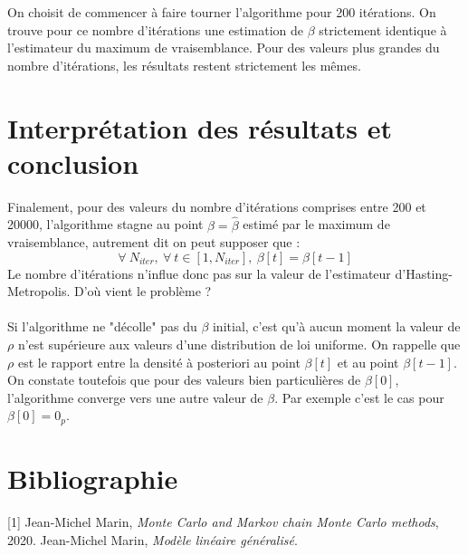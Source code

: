 \documentclass[french,12pt]{report}
\newcommand{\<}{\langle}
\renewcommand{\>}{\rangle}
\theoremstyle{definition}
\begin{document}
\noindent On choisit de commencer à faire tourner l'algorithme pour 200 itérations. On trouve pour ce nombre d'itérations une estimation de $\beta$ strictement identique à l'estimateur du maximum de vraisemblance. Pour des valeurs plus grandes du nombre d'itérations, les résultats restent strictement les mêmes.






\section{Interprétation des résultats et conclusion}

Finalement, pour des valeurs du nombre d'itérations comprises entre 200 et 20000, l'algorithme stagne au point $\beta=\hat{\beta}$ estimé par le maximum de vraisemblance, autrement dit on peut supposer que :  $$\forall  \ N_{iter}, \ \forall \ t \in [1, N_{iter}], \ \beta[t]=\beta[t-1]$$ Le nombre d'itérations n'influe donc pas sur la valeur de l'estimateur d'Hasting-Metropolis. D'où vient le problème ? \\
\\
Si l'algorithme ne "décolle" pas du $\beta$ initial, c'est qu'à aucun moment la valeur de $\rho$ n'est supérieure aux valeurs d'une distribution de loi uniforme. On rappelle que $\rho$ est le rapport entre la densité à posteriori au point $\beta[t]$ et au point $\beta[t-1]$.
\\
On constate toutefois que pour des valeurs bien particulières de $\beta[0]$, l'algorithme converge vers une autre valeur de $\beta$. Par exemple c'est le cas pour $\beta[0]=0_p$.

\newpage

\label{sec:ref}
\section*{Bibliographie}
\vspace{1cm}
[1] Jean-Michel Marin, \textit{Monte Carlo and Markov chain Monte Carlo
methods}, 2020.
\newline
[2] Jean-Michel Marin, \textit{Modèle linéaire généralisé}.
\pagebreak
\end{document}
